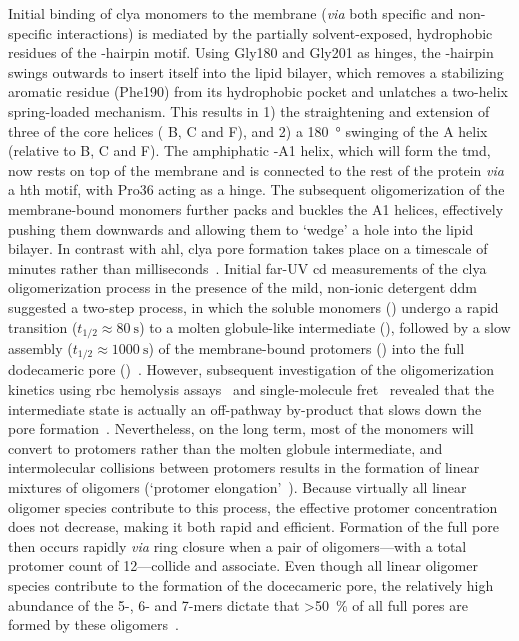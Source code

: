 Initial binding of \gls{clya} monomers to the membrane (\textit{via} both specific and non-specific
interactions) is mediated by the partially solvent-exposed, hydrophobic residues of the \tb-hairpin motif.
Using Gly180 and Gly201 as hinges, the \tb-hairpin swings outwards to insert itself into the lipid bilayer,
which removes a stabilizing aromatic residue (Phe190) from its hydrophobic pocket and unlatches a two-helix
spring-loaded mechanism. This results in 1) the straightening and extension of three of the core helices (\ta
B, \ta C and \ta F), and 2) a \SI{180}{\degree} swinging of the \ta A helix (relative to \ta B, \ta C and \ta
F). The amphiphatic \ta-A1 helix, which will form the \gls{tmd}, now rests on top of the membrane and is
connected to the rest of the protein \textit{via} a \gls{hth} motif, with Pro36 acting as a hinge. The
subsequent oligomerization of the membrane-bound monomers further packs and buckles the \ta A1 helices,
effectively pushing them downwards and allowing them to `wedge' a hole into the lipid bilayer. In contrast
with \gls{ahl}, \gls{clya} pore formation takes place on a timescale of minutes rather than
milliseconds~\cite{Benke-2015}. Initial far-UV \gls{cd} measurements of the \gls{clya} oligomerization process
in the presence of the mild, non-ionic detergent \gls{ddm} suggested a two-step process, in which the soluble
monomers () undergo a rapid transition ($t_{1/2} \approx \SI{80}{\second}$) to a molten globule-like
intermediate (), followed by a slow assembly  ($t_{1/2} \approx \SI{1000}{\second}$) of the
membrane-bound protomers () into the full dodecameric pore ()~\cite{Eifler-2006}. However,
subsequent investigation of the oligomerization kinetics using \gls{rbc} hemolysis
assays~\cite{Vaidyanathan-2014} and single-molecule \gls{fret}~\cite{Benke-2015} revealed that the
intermediate state is actually an off-pathway by-product that slows down the pore
formation~\cite{Roderer-2017}. Nevertheless, on the long term, most of the monomers will convert to protomers
rather than the molten globule intermediate, and intermolecular collisions between protomers results in the
formation of linear mixtures of oligomers (`protomer elongation'~\cite{Roderer-2017}). Because virtually all
linear oligomer species contribute to this process, the effective protomer concentration does not decrease,
making it both rapid and efficient. Formation of the full pore then occurs rapidly \textit{via} ring closure
when a pair of oligomers---with a total protomer count of 12---collide and associate. Even though all linear
oligomer species contribute to the formation of the docecameric pore, the relatively high abundance of the 5-,
6- and 7-mers dictate that \SI{>50}{\percent} of all full pores are formed by these
oligomers~\cite{Benke-2015}.




